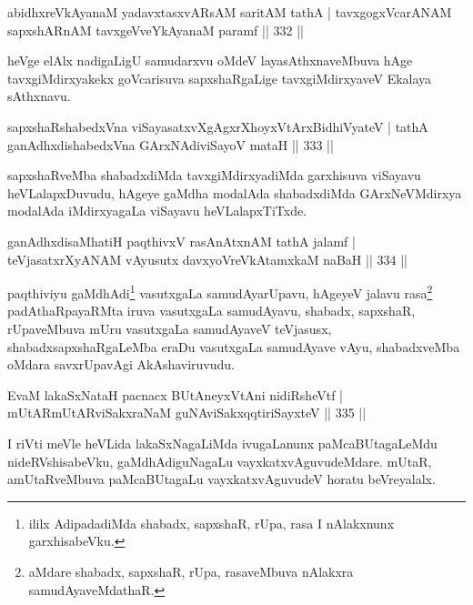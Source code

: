 
\begin{shl}
abidhxreVkAyanaM yadavxtasxvARsAM saritAM tathA |
tavxgogxVcarANAM sapxshARnAM tavxgeVveYkAyanaM paramf \hfill || 332 ||
\end{shl}

\begin{artha}
heVge elAlx nadigaLigU samudarxvu oMdeV layasAthxnaveMbuva hAge tavxgiMdirxyakekx goVcarisuva sapxshaRgaLige tavxgiMdirxyaveV Ekalaya sAthxnavu.
\end{artha}

\begin{shl}
sapxshaRshabedxVna viSayasatxvXgAgxrXhoyxV\s tArxBidhiVyateV |
tathA ganAdhxdishabedxVna GArxNAdiviSayoV mataH \hfill || 333 ||
\end{shl}

\begin{artha}
sapxshaRveMba shabadxdiMda tavxgiMdirxyadiMda garxhisuva viSayavu heVLalapxDuvudu, hAgeye gaMdha modalAda shabadxdiMda GArxNeVMdirxya modalAda iMdirxyagaLa viSayavu heVLalapxTiTxde.
\end{artha}


\begin{shl}
ganAdhxdisaMhatiH paqthivxV rasAnAtxnAM tathA jalamf |
teVjasatxrXyANAM vAyusutx davxyoVreVkAtamxkaM naBaH \hfill || 334 ||
\end{shl}

\begin{artha}
paqthiviyu gaMdhAdi\footnote{ililx AdipadadiMda shabadx, sapxshaR, rUpa, rasa I nAlakxnunx garxhisabeVku.} vasutxgaLa samudAyarUpavu, hAgeyeV jalavu rasa\footnote{aMdare shabadx, sapxshaR, rUpa, rasaveMbuva nAlakxra samudAyaveMdathaR.} padAthaRpayaRMta iruva vasutxgaLa samudAyavu, shabadx, sapxshaR, rUpaveMbuva mUru vasutxgaLa samudAyaveV teVjasusx, shabadxsapxshaRgaLeMba eraDu vasutxgaLa samudAyave vAyu, shabadxveMba oMdara savxrUpavAgi AkAshaviruvudu.
\end{artha}

\begin{shl}
EvaM lakaSxNataH pacnacx BUtAneyxVtAni nidiRsheVtf |
mUtARmUtARviSakxraNaM guNAviSakxqqtiriSayxteV \hfill || 335 ||
\end{shl}

\begin{artha}
I riVti meVle heVLida lakaSxNagaLiMda ivugaLanunx paMcaBUtagaLeMdu nideRVshisabeVku, gaMdhAdiguNagaLu vayxkatxvAguvudeMdare. mUtaR, amUtaRveMbuva paMcaBUtagaLu vayxkatxvAguvudeV horatu beVreyalalx.
\end{artha}

